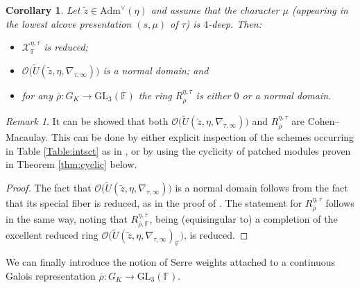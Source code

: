\documentclass[oneside,a4paper,english, 11pt]{amsart}
\theoremstyle{plain}
\theoremstyle{plain}
\theoremstyle{plain}
\theoremstyle{plain}
\theoremstyle{plain}
\theoremstyle{plain}
\newtheorem{cor}[thm]{Corollary}
\theoremstyle{definition}
\theoremstyle{definition}
\theoremstyle{definition}
\theoremstyle{remark}
\newtheorem{rmk}[thm]{Remark}
\numberwithin{equation}{section}
\newcommand{\F}{\mathbb{F}}
\newcommand{\bF}{\mathbb{F}}
\newcommand{\cO}{\mathcal{O}}
\newcommand{\cX}{\mathcal{X}}
\newcommand{\GL}{\mathrm{GL}}
\newcommand{\Adm}{\mathrm{Adm}}
\newcommand{\tld}[1]{\widetilde{#1}}
\newcommand{\rhobar}{\overline{\rho}}
\newcommand{\ra}{\rightarrow}
\begin{document}
%
%
\begin{cor}
\label{thm:local_model_main} 
Let $\tld{z}\in\Adm^{\vee}(\eta)$ and assume that the character $\mu$ (appearing in the lowest alcove presentation $(s,\mu)$ of $\tau$) is $4$-deep. 
%
Then:
\begin{itemize}
\item $\cX^{\eta,\tau}_{\bF}$ is reduced; 
\item $\cO\big(\tld{U}(\tld{z},\eta,\nabla_{\tau,\infty})\big)$ is a normal domain; and
\item
for any $\rhobar:G_K\ra\GL_3(\F)$ the ring $R^{\eta,\tau}_{\rhobar}$ is either $0$ or a normal domain. 
\end{itemize}
\end{cor}

\begin{rmk}
\label{rmk:CM}
It can be showed that both $\cO\big(\tld{U}(\tld{z},\eta,\nabla_{\tau,\infty})\big)$ and $R^{\eta,\tau}_{\rhobar}$ are Cohen--Macaulay. This can be done by either explicit inspection of the schemes occurring in Table \ref{Table:intsct} as in \cite[\S 8]{LLLM}, or by using the cyclicity of patched modules proven in Theorem \ref{thm:cyclic} below. 
%
\end{rmk}

\begin{proof}
 The fact that $\cO\big(\tld{U}(\tld{z},\eta,\nabla_{\tau,\infty})\big)$ is a normal domain follows from the fact that its special fiber is reduced, as in the proof of \cite[Proposition 8.5]{LLLM}.
%
The statement for $R^{\eta,\tau}_{\rhobar}$ follows in the same way, noting that $R^{\eta,\tau}_{\rhobar,\F}$, being (equisingular to) a completion of the excellent reduced ring $\cO\big(\tld{U}(\tld{z},\eta,\nabla_{\tau,\infty})_\F \big)$, is reduced.
\end{proof}

We can finally introduce the notion of Serre weights attached to a continuous Galois representation $\rhobar:G_K\ra\GL_3(\F)$.
\end{document}
